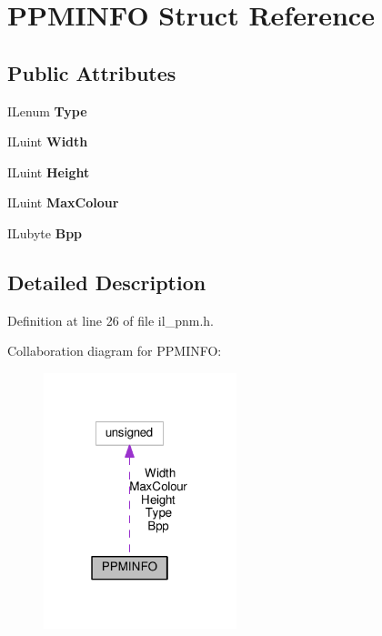 \hypertarget{structPPMINFO}{}\section{P\+P\+M\+I\+N\+FO Struct Reference}
\label{structPPMINFO}
\subsection*{Public Attributes}
\begin{DoxyCompactItemize}
\item 
\mbox{\label{structPPMINFO_af2e63c145ab224258e7a24184213c5bc}} 
I\+Lenum {\bfseries Type}
\item 
\mbox{\label{structPPMINFO_a92882716fcd68eb87ff42aa680384507}} 
I\+Luint {\bfseries Width}
\item 
\mbox{\label{structPPMINFO_a4e1cd0591ec8d6f4e84972ad0d6d649c}} 
I\+Luint {\bfseries Height}
\item 
\mbox{\label{structPPMINFO_a3d483014bb79ca7dd88b51be833a66a7}} 
I\+Luint {\bfseries Max\+Colour}
\item 
\mbox{\label{structPPMINFO_a9d7106e8f4992b009014b582e033cdf6}} 
I\+Lubyte {\bfseries Bpp}
\end{DoxyCompactItemize}


\subsection{Detailed Description}


Definition at line 26 of file il\+\_\+pnm.\+h.



Collaboration diagram for P\+P\+M\+I\+N\+FO\+:
\nopagebreak
\begin{figure}[H]
\begin{center}
\leavevmode
\includegraphics[width=159pt]{dd/d03/structPPMINFO__coll__graph}
\end{center}
\end{figure}


